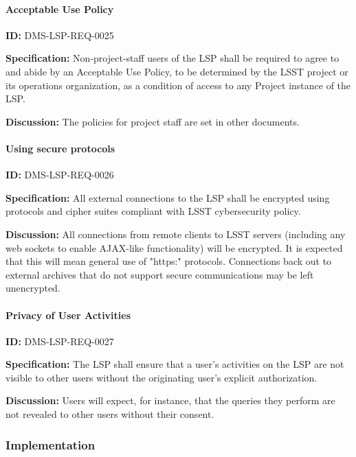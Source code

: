 \documentclass[SE,toc,lsstdraft]{lsstdoc}
\begin{document}
\paragraph{Acceptable Use Policy}\hfill  %

\label{DMS-LSP-REQ-0025}
\textbf{ID:} DMS-LSP-REQ-0025

\textbf{Specification:}
Non-project-staff users of the LSP shall be required to agree to and abide by an Acceptable Use Policy, to be determined by the LSST project or its operations organization, as a condition of access to any Project instance of the LSP.

\textbf{Discussion:}
The policies for project staff are set in other documents.

\paragraph{Using secure protocols}\hfill  %

\label{DMS-LSP-REQ-0026}
\textbf{ID:} DMS-LSP-REQ-0026

\textbf{Specification:}
All external connections to the LSP shall be encrypted using protocols and cipher suites compliant with LSST cybersecurity policy.

\textbf{Discussion:}
All connections from remote clients to LSST servers (including any web sockets to enable AJAX-like functionality) will be encrypted. It is expected that this will mean general use of "https:" protocols.
Connections back out to external archives that do not support secure communications may be left unencrypted.

\paragraph{Privacy of User Activities}\hfill  %

\label{DMS-LSP-REQ-0027}
\textbf{ID:} DMS-LSP-REQ-0027

\textbf{Specification:}
The LSP shall ensure that a user's activities on the LSP are not visible to other users without the originating user's explicit authorization.

\textbf{Discussion:}
Users will expect, for instance, that the queries they perform are not revealed to other users without their consent.

\subsubsection{Implementation}
\end{document}
